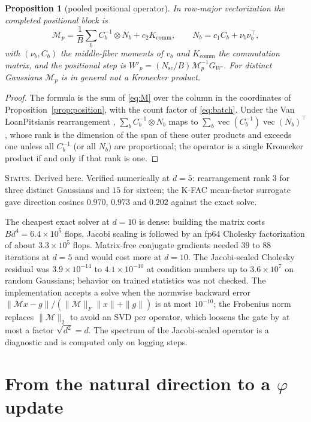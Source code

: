 \documentclass[11pt]{article}
\newtheorem{proposition}[theorem]{Proposition}
\theoremstyle{definition}
\theoremstyle{remark}
\newcommand{\vect}{\operatorname{vec}}
\newcommand{\Nsc}{N_{\mathrm{sc}}}
\newcommand{\ndash}{\textendash}
\newcommand{\status}[1]{\par\smallskip\noindent\textsc{Status.} #1\par\smallskip}
\begin{document}
\begin{proposition}[pooled positional operator]\label{prop:pooled}
In row-major vectorization the completed positional block is
\begin{equation}\label{eq:pooled}
\mathcal{M}_p=\frac1B\sum_bC_b^{-1}\otimes N_b+c_2K_{\mathrm{comm}},\qquad N_b=c_1C_b+\nu_b\nu_b^\top,
\end{equation}
with $(\nu_b,C_b)$ the middle-fiber moments of $v_b$ and $K_{\mathrm{comm}}$ the commutation matrix, and the positional step is $W'_p=(\Nsc/B)\mathcal{M}_p^{-1}G_{W'}$. For distinct Gaussians $\mathcal{M}_p$ is in general not a Kronecker product.
\end{proposition}
\begin{proof}
The formula is the sum of \eqref{eq:M} over the column in the coordinates of Proposition~\ref{prop:position}, with the count factor of \eqref{eq:batch}. Under the Van Loan\ndash Pitsianis rearrangement \cite{VanLoanPitsianis1993}, $\sum_bC_b^{-1}\otimes N_b$ maps to $\sum_b\vect(C_b^{-1})\vect(N_b)^\top$, whose rank is the dimension of the span of these outer products and exceeds one unless all $C_b^{-1}$ (or all $N_b$) are proportional; the operator is a single Kronecker product if and only if that rank is one.
\end{proof}
\status{Derived here. Verified numerically at $d=5$: rearrangement rank $3$ for three distinct Gaussians and $15$ for sixteen; the K-FAC mean-factor surrogate gave direction cosines $0.970$, $0.973$ and $0.202$ against the exact solve.}

The cheapest exact solver at $d=10$ is dense: building the matrix costs $Bd^4=6.4\times10^5$ flops, Jacobi scaling is followed by an fp64 Cholesky factorization of about $3.3\times10^5$ flops. Matrix-free conjugate gradients needed $39$ to $88$ iterations at $d=5$ and would cost more at $d=10$. The Jacobi-scaled Cholesky residual was $3.9\times10^{-14}$ to $4.1\times10^{-10}$ at condition numbers up to $3.6\times10^7$ on random Gaussians; behavior on trained statistics was not checked. The implementation accepts a solve when the normwise backward error $\|\mathcal{M}x-g\|/(\|\mathcal{M}\|_F\|x\|+\|g\|)$ is at most $10^{-10}$; the Frobenius norm replaces $\|\mathcal{M}\|_2$ to avoid an SVD per operator, which loosens the gate by at most a factor $\sqrt{d^2}=d$. The spectrum of the Jacobi-scaled operator is a diagnostic and is computed only on logging steps.

\section{From the natural direction to a \texorpdfstring{$\varphi$}{phi} update}\label{sec:update}
\end{document}
